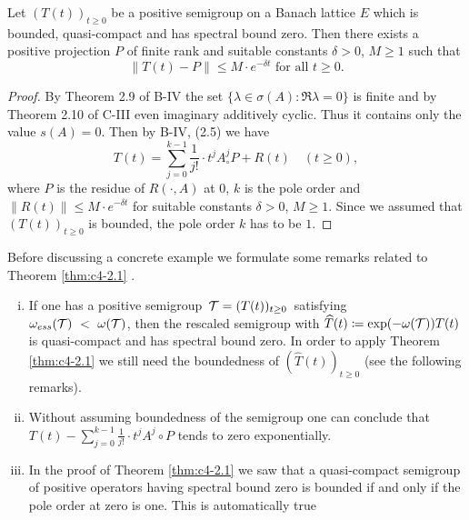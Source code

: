 \begin{theorem}\label{thm:c4-2.1}
Let $(T(t))_{t \geq 0}$ be a positive semigroup on a Banach lattice $E$ which is bounded, quasi-compact and has spectral bound zero.
Then there exists a positive projection $P$ of finite rank and suitable constants $\delta > 0$, $M \geq 1$ such that
\begin{equation}\label{eq:c4-2.1}
\|T(t) - P\| \leq M \cdot e^{-\delta t} \text{ for all } t \geq 0.
\end{equation}
\end{theorem}

\begin{proof}
By Theorem 2.9 of B-IV the set $\{\lambda \in \sigma(A) \colon \Re  \lambda = 0\}$ is finite and by Theorem 2.10 of C-III even imaginary additively cyclic.
Thus it contains only the value $s(A) = 0$.
Then by B-IV, (2.5) we have
\begin{equation*}\label{eq:c4-2.1-kgk}
T(t) = \sum_{j=0}^{k-1} \frac{1}{j!} \cdot t^{j}A^{j}_{\circ}P + R(t) \quad (t \geq 0),
\end{equation*}
where $P$ is the residue of $R(\cdot,A)$ at $0$, $k$ is the pole order and $\|R(t)\| \leq M \cdot e^{-\delta t}$ for suitable constants $\delta > 0$, $M \geq 1$.
Since we assumed that $(T(t))_{t \geq 0}$ is bounded, the pole order $k$ has to be $1$.
\end{proof}

Before discussing a concrete example we formulate some remarks related to Theorem \ref{thm:c4-2.1} .

\begin{remarks}\label{rem:c4-2.2}
\begin{enumerate}[(i)]
\item \label{rem:c4-2.2-1}
If one has a positive semigroup\, $\mathcal{T} = (T(t))_{t \geq 0}$\,  satisfying\\ $\omega_{ess}(\mathcal{T})~<~\omega(\mathcal{T})$, then the rescaled semigroup with $\widehat{T}(t) \coloneqq \exp(-\omega(\mathcal{T}))T(t)$ is quasi-compact and has spectral bound zero.
In order to apply Theorem \ref{thm:c4-2.1} we still need the boundedness of $(\widehat{T}(t))_{t\geq 0}$ (see the following remarks).
\item \label{rem:c4-2.2-2}
Without assuming boundedness of the semigroup one can conclude that $T(t) - \sum_{j=0}^{k-1} \frac{1}{j!} \cdot t^{j}A^{j}{\circ}P$ tends to zero exponentially.
\item \label{rem:c4-2.2-3}
In the proof of Theorem \ref{thm:c4-2.1} we saw that a quasi-compact semigroup of positive operators having spectral bound zero is bounded if and only if the pole order at zero is one.
This is automatically true
\end{enumerate}
\end{remarks}

